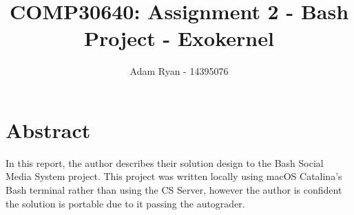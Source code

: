 \documentclass[11pt]{article}
\theoremstyle{plain}
\theoremstyle{definition}
\begin{document}
\title{COMP30640: Assignment 2 - Bash Project - Exokernel}
\author{Adam Ryan - 14395076}
\maketitle

\section{Abstract}\label{section:Abstract}
In this report, the author describes their solution design to the Bash Social Media System project. This project was written locally using macOS Catalina's Bash terminal rather than using the CS Server, however the author is confident the solution is portable due to it passing the autograder.

\pagebreak
\tableofcontents
\pagebreak
\end{document}
